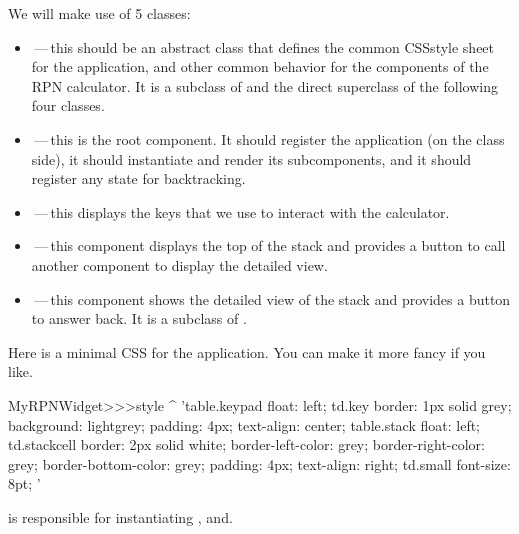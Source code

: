 \documentclass[a4paper,10pt,twoside]{book}
\begin{document}
We will make use of 5 classes:
\begin{itemize}
\item {}\,---\,this should be an abstract class that defines the common CSSstyle sheet for the application, and other common behavior for the components of the RPN
calculator.
It is a subclass of  and the direct superclass of the following four
classes.
  
    \item {}\,---\,this is the root component.
It should register the application (on the class side), it should instantiate and render
its subcomponents, and it should register any state for backtracking.
\item {}\,---\,this displays the keys that we use to interact with the
calculator.
\item {}\,---\,this component displays the top of the stack and provides a
button to call another component to display the detailed view.
\item {}\,---\,this component shows the detailed view of the stack and
provides a button to answer back.
  It is a subclass of .
\end{itemize}


Here is a minimal CSS for the application.
You can make it more fancy if you like.
\begin{code}{}
MyRPNWidget>>>style
	^ 'table.keypad { float: left; }
td.key {
	border: 1px solid grey;
	background: lightgrey;
	padding: 4px;
	text-align: center;
}
table.stack { float: left; }
td.stackcell {
	border: 2px solid white;
	border-left-color: grey;
	border-right-color: grey;
	border-bottom-color: grey;
	padding: 4px;
	text-align: right;
}
td.small { font-size: 8pt; }'
\end{code}


 is responsible for instantiating ,  and.

\end{document}
